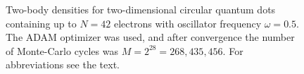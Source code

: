 \begin{landscape}
\begin{figure}
		\caption{Two-body densities for two-dimensional circular quantum dots containing up to $N=42$ electrons with oscillator frequency $\omega=0.5$. The  ADAM optimizer was used, and after convergence the number of Monte-Carlo cycles was $M=2^{28}=268,435,456$. For abbreviations see the text.}%
		\label{fig:TB_2D_0p5w}
	\end{figure}
	\begin{figure}
		\centering
		\captionsetup[subfigure]{labelformat=empty}
		\hspace{0.1cm}
		\\
		

\end{figure}
\end{landscape}
